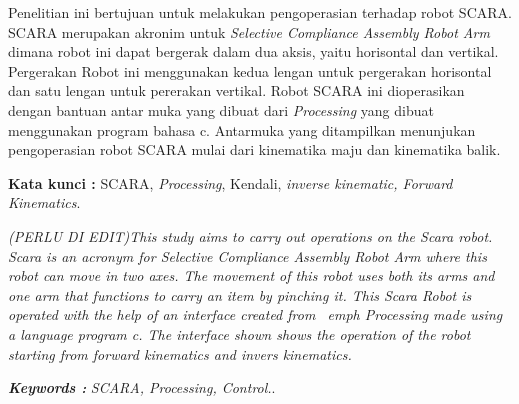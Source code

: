 \documentclass{DTEDI_KP}
\begin{document}
\tableofcontents
{}
\listoftables
{}
\listoffigures
{}


\begin{abstractind}
	Penelitian ini bertujuan untuk melakukan pengoperasian terhadap robot SCARA. SCARA merupakan akronim untuk \emph{Selective Compliance Assembly Robot Arm} dimana robot ini dapat bergerak dalam dua aksis, yaitu horisontal dan vertikal. Pergerakan Robot ini menggunakan kedua lengan untuk pergerakan horisontal dan satu lengan untuk pererakan vertikal. Robot SCARA ini dioperasikan dengan bantuan antar muka yang dibuat dari \emph{Processing} yang dibuat menggunakan program bahasa c. Antarmuka yang ditampilkan menunjukan pengoperasian robot SCARA mulai dari kinematika maju dan kinematika balik.


\bigskip
\noindent
\textbf{Kata kunci :} SCARA, \emph{Processing}, Kendali, \emph{inverse kinematic, Forward Kinematics}.
\end{abstractind}
	
\begin{abstracteng}
\emph{
(PERLU DI EDIT)This study aims to carry out operations on the Scara robot. Scara is an acronym for Selective Compliance Assembly Robot Arm where this robot can move in two axes. The movement of this robot uses both its arms and one arm that functions to carry an item by pinching it. This Scara Robot is operated with the help of an interface created from \ emph {Processing} made using a language program c. The interface shown shows the operation of the robot starting from forward kinematics and invers kinematics.}


\bigskip
\noindent
\textbf{\emph{Keywords :}} \emph{SCARA, \emph{Processing}, Control.}.
\end{abstracteng}
\end{document}
